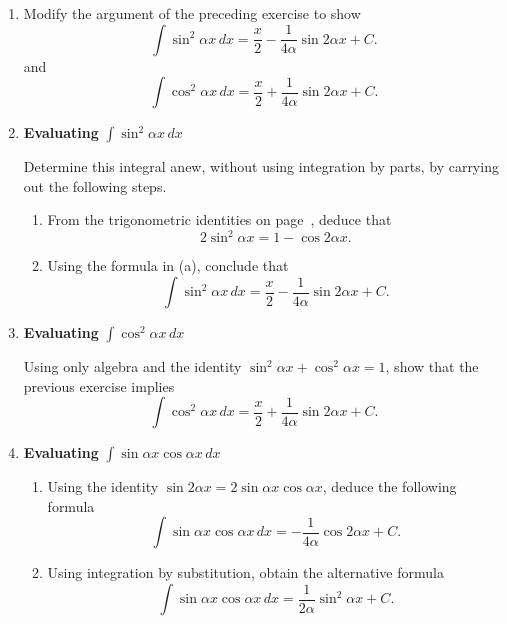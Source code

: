 \begin{enumerate}
\begin{enumerate}
  \item Using algebra and a trigonometric identity, conclude that
	\[
\int \sin^2{x} \, dx = 
		\dfrac{x}{2} - \dfrac{1}{4} \sin{2x} + C.
\]


\end{enumerate}
\item Modify the argument of the preceding exercise to show		%
	\[
\int \sin^2{\alpha x}\,dx  =  
	  \dfrac{x}{2} - \dfrac{1}{4\alpha}\sin{2\alpha x} + C.
\]
and
	\[
\int \cos^2{\alpha x}\,dx  =  
	  \dfrac{x}{2} + \dfrac{1}{4\alpha}\sin{2\alpha x} + C.
\]



\item {\bf Evaluating }$\displaystyle \int \sin^2{\alpha x} \, dx$



Determine this integral anew, without using integration by parts, by
carrying out the following steps.

  \begin{enumerate}
  \item From the trigonometric identities
on page~\pageref{`trig'}, deduce that
	\[
2 \sin^2 {\alpha x} = 1 - \cos{2 \alpha x}.
\]


  \item Using the formula in (a), conclude that
	\[
\int \sin^2{\alpha x} \, dx = 
	\dfrac{x}{2} - \dfrac{1}{4\alpha}\sin{2\alpha x} + C.
\]


\end{enumerate}
\item {\bf Evaluating }$\displaystyle \int \cos^2{\alpha x} \, dx$



Using only algebra and the identity $\sin^2{\alpha x} + \cos^2{\alpha
  x} = 1$, show that the previous exercise implies
	\[
\int \cos^2{\alpha x} \, dx = 
	\dfrac{x}{2} + \dfrac{1}{4\alpha}\sin{2\alpha x} + C.
\]


\item {\bf Evaluating }$\displaystyle
		\int \sin{\alpha x} \cos{\alpha x} \, dx$  


  \begin{enumerate}
  \item Using the identity $\sin{2\alpha x} = 2 \sin{\alpha x}
\cos{\alpha x}$, deduce the following formula
	\[
\int \sin{\alpha x} \cos{\alpha x} \, dx = 
		-\dfrac{1}{4\alpha} \cos{ 2 \alpha x} + C.
\]


  \item Using integration by substitution, obtain the alternative formula
	\[
\int \sin{\alpha x} \cos{\alpha x} \, dx = 
		\dfrac{1}{2\alpha} \sin^2{\alpha x} + C.
\]



\end{enumerate}
\end{enumerate}
